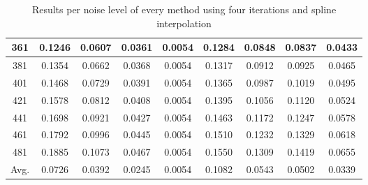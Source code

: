 \begin{table}[ht!]
\begin{tabular}{c|c|c|c|c|c|c|c|c}
361 & 0.1246 & 0.0607 & 0.0361 & 0.0054 & 0.1284 & 0.0848 & 0.0837 & 0.0433 \\ \hline
381 & 0.1354 & 0.0662 & 0.0368 & 0.0054 & 0.1317 & 0.0912 & 0.0925 & 0.0465 \\ \hline
401 & 0.1468 & 0.0729 & 0.0391 & 0.0054 & 0.1365 & 0.0987 & 0.1019 & 0.0495 \\ \hline
421 & 0.1578 & 0.0812 & 0.0408 & 0.0054 & 0.1395 & 0.1056 & 0.1120 & 0.0524 \\ \hline
441 & 0.1698 & 0.0921 & 0.0427 & 0.0054 & 0.1463 & 0.1172 & 0.1247 & 0.0578 \\ \hline
461 & 0.1792 & 0.0996 & 0.0445 & 0.0054 & 0.1510 & 0.1232 & 0.1329 & 0.0618 \\ \hline
481 & 0.1885 & 0.1073 & 0.0467 & 0.0054 & 0.1550 & 0.1309 & 0.1419 & 0.0655 \\ \hline
Avg.  & 0.0726 & 0.0392 & 0.0245 & 0.0054 & 0.1082 & 0.0543 & 0.0502 & 0.0339 \\ \hline
\end{tabular}
\caption{Results per noise level of every method using four iterations and spline interpolation}
\label{tab:4itSperNoise}
\end{table}


